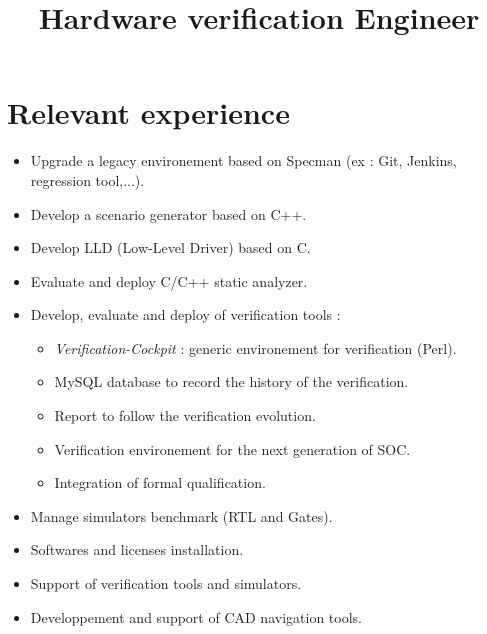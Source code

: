 \documentclass[11pt,a4paper,sans]{moderncv}
\title{Hardware verification Engineer}
\begin{document}
\makecvtitle
\section{Relevant experience}
%
{%
\begin{itemize}%
\item Upgrade a legacy environement based on Specman  (ex : Git, Jenkins, regression tool,...).
\item Develop a scenario generator  based on  C++.
\item Develop LLD (Low-Level Driver) based on C.
\item Evaluate and deploy C/C++ static analyzer.
\end{itemize}}

%
{%
\begin{itemize}%
\item Develop, evaluate and deploy of verification tools :
 \begin{itemize}%
 \item \textit{Verification-Cockpit} : generic environement for verification (Perl).
\item MySQL database to record the history of the verification.
\item Report to follow the verification evolution.
\item Verification environement for the next generation of SOC.
\item Integration of formal qualification.
\end{itemize}
\item Manage simulators benchmark (RTL and Gates).
\end{itemize}}

%
{%
\begin{itemize}%
\item Softwares and licenses installation.
\item Support of verification tools and simulators.
\item Developpement and support of CAD navigation tools.
\end{itemize}}

\end{document}
